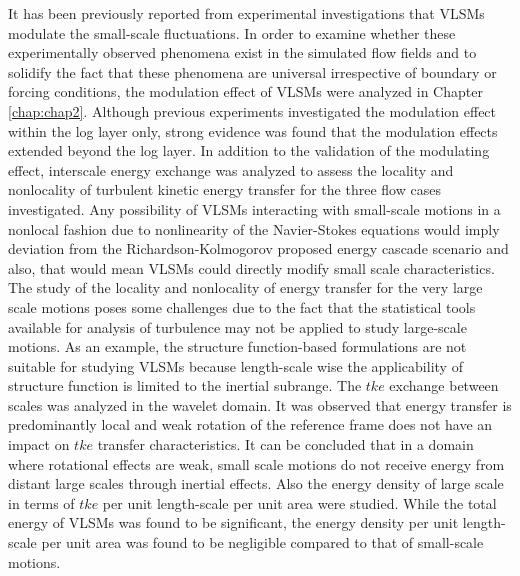 It has been previously reported from experimental investigations that VLSMs modulate the small-scale fluctuations. In order to examine whether these experimentally observed phenomena exist in the simulated flow fields and to solidify the fact that these phenomena are universal irrespective of boundary or forcing conditions, the modulation effect of VLSMs were analyzed in Chapter \ref{chap:chap2}. Although previous experiments investigated the modulation effect within the log layer only, strong evidence was found that the modulation effects extended beyond the log layer. In addition to the validation of the modulating effect, interscale energy exchange was analyzed to assess the locality and nonlocality of turbulent kinetic energy transfer for the three flow cases investigated. Any possibility of VLSMs interacting with small-scale motions in a nonlocal fashion due to nonlinearity of the Navier-Stokes equations would imply deviation from the Richardson-Kolmogorov proposed energy cascade scenario and also, that would mean VLSMs could directly modify small scale characteristics. The study of the locality and nonlocality of energy transfer for the very large scale motions poses some challenges due to the fact that the statistical tools available for analysis of turbulence may not be applied to study large-scale motions. As an example, the structure function-based formulations are not suitable for studying VLSMs because length-scale wise the applicability of structure function is limited to the inertial subrange. The $tke$ exchange between scales was analyzed in the wavelet domain. It was observed that energy transfer is predominantly local and weak rotation of the reference frame does not have an impact on $tke$ transfer characteristics. It can be concluded that in a domain where rotational effects are weak, small scale motions do not receive energy from distant large scales through inertial effects. Also the energy density of large scale in terms of $tke$ per unit length-scale per unit area were studied. While the total energy of VLSMs was found to be significant, the energy density per unit length-scale per unit area was found to be negligible compared to that of small-scale motions. 

